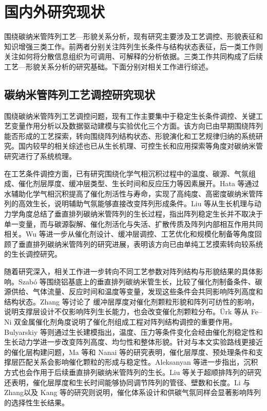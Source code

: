 \section{国内外研究现状}

围绕碳纳米管阵列工艺—形貌关系分析，现有研究主要涉及工艺调控、形貌表征和知识增强三类工作。前两者分别关注阵列生长条件与结构状态表征，后一类工作则关注如何将分散信息组织为可调用、可解释的分析依据。三类工作共同构成了后续工艺—形貌关系分析的研究基础。下面分别对相关工作进行综述。

\subsection{碳纳米管阵列工艺调控研究现状}

围绕碳纳米管阵列工艺调控问题，现有工作主要集中于稳定生长条件调控、关键工艺变量作用分析以及数据驱动建模与实验优化三个方面。该方向已由早期围绕阵列能否形成的工艺探索，转向围绕阵列结构状态、形貌演化和工艺规律归纳的系统研究。国内较早的相关综述也已从生长机理、可控生长和应用探索等角度对碳纳米管研究进行了系统梳理\cite{Fan2006CNTGrowthCN}。

在工艺条件调控方面，已有研究围绕化学气相沉积过程中的温度、碳源、气氛组成、催化剂层厚度、缓冲层类型、生长时间和反应压力等因素展开。Hata 等\cite{Hata2004}通过水辅助化学气相沉积提高了催化剂活性与寿命，实现了高纯度、高密度碳纳米管阵列的高效生长，说明辅助气氛能够直接改变阵列形成条件。Liu 等\cite{Liu2021EcoMat}从生长机理与动力学角度总结了垂直排列碳纳米管阵列的生长过程，指出阵列稳定生长并不取决于单一变量，而与碳源裂解、催化剂活化与失活、扩散传质及阵列内部相互作用共同相关。Wu 等\cite{Wu2025VACNTReview}进一步从催化剂设计、缓冲层调控、工艺优化和规模化制备等角度回顾了垂直排列碳纳米管阵列的研究进展，表明该方向已由单纯工艺摸索转向较系统的生长调控研究。

随着研究深入，相关工作进一步转向不同工艺参数对阵列结构与形貌结果的具体影响。Szab\'{o} 等\cite{Szabo2017}围绕铝基底上的垂直排列碳纳米管生长，比较了催化剂制备条件、碳源供给、气体流量、反应时间和温度等变量，发现这些条件会共同影响阵列高度和结构状态。Zhang 等\cite{Zhang2017BufferLayer}讨论了  缓冲层厚度对催化剂颗粒形貌和阵列可纺性的影响，说明支撑层设计不仅影响阵列生长能力，也会改变催化剂颗粒分布。\"{U}rk 等\cite{Urk2021}从 Fe--Ni 双金属催化剂角度说明了催化剂组成工程对阵列结构调控的重要作用。Bulyarskiy 等\cite{Bulyarskiy2020}则通过生长建模指出，温度、压力等条件变化会经由催化剂稳定性和生长动力学进一步改变阵列高度、均匀性和整体形貌。针对与本文实验路线更接近的催化层构建问题，Ma 等\cite{Ma2020CMOSReview}和 Nanai 等\cite{Nanai2024AZO}的研究表明，催化层厚度、预处理条件和支撑层匹配关系会影响催化颗粒的形成与稳定性。Aleksanyan 等\cite{Aleksanyan2023RFMagnetron}进一步指出，沉积方式也会作用于后续垂直排列碳纳米管阵列的生长。Liu 等\cite{Liu2008SuperAlignedCNTArrays}关于超顺排阵列的研究还表明，催化层厚度和生长时间能够协同调节阵列的管径、壁数和长度。Li 与 Zhang\cite{Li2016FeCuCNTForest}以及 Kang 等\cite{Kang2016HydrogenFreeSWNTArrays}的研究则说明，催化体系设计和供碳气氛同样会显著影响阵列的选择性生长结果。

